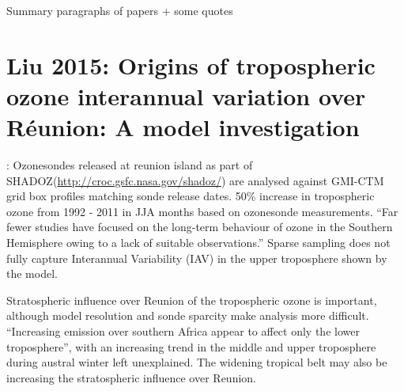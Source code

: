 \documentclass[11pt]{article} %
\begin{document}

\begin{titlepage}
\begin{center}
Summary paragraphs of papers + some quotes

\end{center}
\end{titlepage}

\tableofcontents %
\listoffigures %
\listoftables %


\section{Liu 2015: Origins of tropospheric ozone interannual variation over Réunion: A model investigation}
  \citet{Liu2015}:
  Ozonesondes released at reunion island as part of SHADOZ(\url{http://croc.gsfc.nasa.gov/shadoz/}) are analysed against GMI-CTM grid box profiles matching sonde release dates.
  50\% increase in tropospheric ozone from 1992 - 2011 in JJA months based on ozonesonde measurements.
  ``Far fewer studies have focused on the long-term behaviour of ozone in the Southern Hemisphere owing to a lack of suitable observations.''
  Sparse sampling does not fully capture Interannual Variability (IAV) in the upper troposphere shown by the model.
  
  Stratospheric influence over Reunion of the tropospheric ozone is important, although model resolution and sonde sparcity make analysis more difficult.
  ``Increasing emission over southern Africa appear to affect only the lower troposphere'', with an increasing trend in the middle and upper troposphere during austral winter left unexplained.
  The widening tropical belt may also be increasing the stratospheric influence over Reunion.

\printbibliography[heading=bibintoc]
\end{document}
